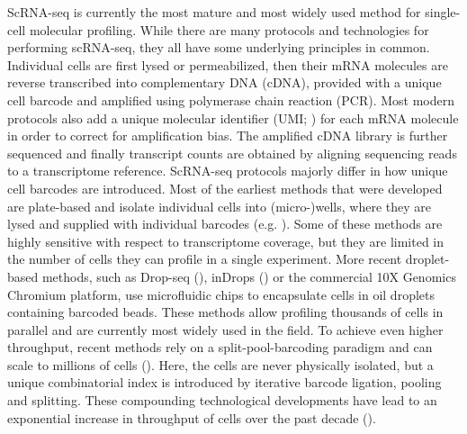 ScRNA-seq is currently the most mature and most widely used method for single-cell molecular profiling. While there are many protocols and technologies for performing scRNA-seq, they all have some underlying principles in common. Individual cells are first lysed or permeabilized, then their mRNA molecules are reverse transcribed into complementary DNA (cDNA), provided with a unique cell barcode and amplified using polymerase chain reaction (PCR). Most modern protocols also add a unique molecular identifier (UMI; \cite{islam_quantitative_2014}) for each mRNA molecule in order to correct for amplification bias. The amplified cDNA library is further sequenced and finally transcript counts are obtained by aligning sequencing reads to a transcriptome reference. ScRNA-seq protocols majorly differ in how unique cell barcodes are introduced. Most of the earliest methods that were developed are plate-based and isolate individual cells into (micro-)wells, where they are lysed and supplied with individual barcodes (e.g. \cite{picelli_smart-seq2_2013,shalek_single-cell_2014,jaitin_massively_2014,treutlein_reconstructing_2014}). Some of these methods are highly sensitive with respect to transcriptome coverage, but they are limited in the number of cells they can profile in a single experiment. More recent droplet-based methods, such as Drop-seq (\cite{macosko_highly_2015}), inDrops (\cite{klein_droplet_2015}) or the commercial 10X Genomics Chromium platform, use microfluidic chips to encapsulate cells in oil droplets containing barcoded beads. These methods allow profiling thousands of cells in parallel and are currently most widely used in the field. To achieve even higher throughput, recent methods rely on a split-pool-barcoding paradigm and can scale to millions of cells (\cite{rosenberg_single-cell_2018,yin_high-throughput_2019,cao_comprehensive_2017}). Here, the cells are never physically isolated, but a unique combinatorial index is introduced by iterative barcode ligation, pooling and splitting. These compounding technological developments have lead to an exponential increase in throughput of cells over the past decade (\cite{svensson_exponential_2018}).






